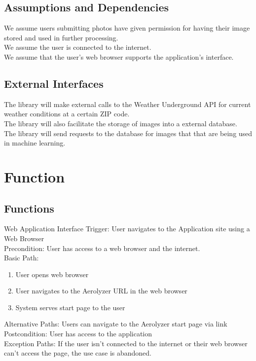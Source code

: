 \documentclass[journal,10pt,draftclsnofoot,onecolumn]{IEEEtran}
\makeatletter
\renewcommand\subsubsection{\@startsection{subsubsection}{3}{\z@}
                                     {-3.25ex\@plus -1ex \@minus -.2ex}
                                     {-1.5ex \@plus -.2ex}
                                     {\normalfont\normalsize\bfseries}}
\makeatother
\begin{document}
\begin{singlespace}
	\subsection{Assumptions and Dependencies}
		We assume users submitting photos have given permission for having their image stored and used in further processing.\\
		We assume the user is connected to the internet.\\
		We assume that the user's web browser supports the application's interface.\\


	\subsection{External Interfaces}
		The library will make external calls to the Weather Underground API for current weather conditions at a certain ZIP code.\\
		The library will also facilitate the storage of images into a external database.\\
		The library will send requests to the database for images that that are being used in machine learning.

\clearpage

\section{Function}
	\subsection{Functions}
		\subsubsection{Web Application Interface}
			Trigger: User navigates to the Application site using a Web Browser\\
			Precondition: User has access to a web browser and the internet.\\
			Basic Path:
			\begin{enumerate}
				\item User opens web browser
				\item User navigates to the Aerolyzer URL in the web browser
				\item System serves start page to the user
			\end{enumerate}
			Alternative Paths: Users can navigate to the Aerolyzer start page via link\\
			Postcondition: User has access to the application\\
			Exception Paths: If the user isn't connected to the internet or their web browser can't access the page, the use case is abandoned.
		

\end{singlespace}
\end{document}
